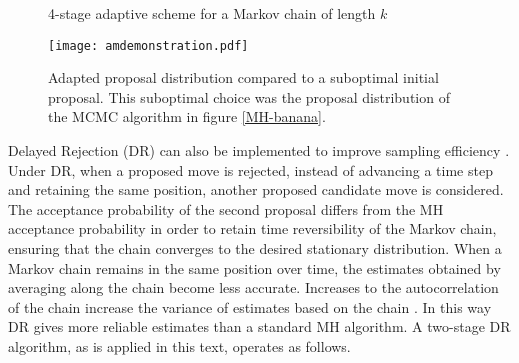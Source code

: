 \begin{figure}[h]
\begin{minipage}{1.0\linewidth}
\centering
\end{minipage}

\caption{4-stage adaptive scheme for a Markov chain of length $k$}
\label{4-stage-am}
\end{figure}

\begin{figure}[H]
	\centering
	\texttt{[image: amdemonstration.pdf]}
	\caption{Adapted proposal distribution compared to a suboptimal initial proposal. This suboptimal choice was the proposal distribution of the MCMC algorithm in figure \ref{MH-banana}.}
	\label{AM-demonstration}
\end{figure}

Delayed Rejection (DR) can also be implemented to improve sampling efficiency \citep{Mira2001}. Under DR, when a proposed move is rejected, instead of advancing a time step and retaining the same position, another proposed candidate move is considered. The acceptance probability of the second proposal differs from the MH acceptance probability in order to retain time reversibility of the Markov chain, ensuring that the chain converges to the desired stationary distribution. When a Markov chain remains in the same position over time, the estimates obtained by averaging along the chain become less accurate. Increases to the autocorrelation of the chain increase the variance of estimates based on the chain \citep{Mira2001}. In this way DR gives more reliable estimates than a standard MH algorithm. A two-stage DR algorithm, as is applied in this text, operates as follows. \par

